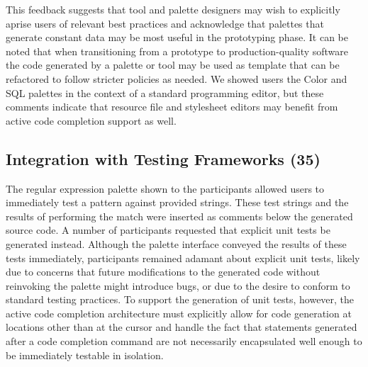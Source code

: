 \documentclass[10pt, conference, compsocconf]{IEEEtran}
\begin{document}
This feedback suggests that tool and palette designers may wish to explicitly aprise users of relevant best practices and acknowledge that palettes that generate constant data may be most useful in the prototyping phase. It can be noted that when transitioning from a prototype to production-quality software the code generated by a palette or tool may be used as template that can be refactored to follow stricter policies as needed. We showed users the Color and SQL palettes in the context of a standard programming editor, but these comments indicate that resource file and  stylesheet editors may benefit from active code completion support as well.

\subsection{Integration with Testing Frameworks (35)}
The regular expression palette shown to the participants allowed users to immediately test a pattern against provided strings. These test strings and the results of performing the match were inserted as comments below the generated source code. A number of participants requested that explicit unit tests be generated instead. Although the palette interface conveyed the results of these tests immediately, participants remained adamant about explicit unit tests, likely due to concerns that future modifications to the generated code without reinvoking the palette might introduce bugs, or due to the desire to conform to standard testing practices. To support the generation of unit tests, however, the active code completion architecture must explicitly allow for code generation at locations other than at the cursor and handle the fact that statements generated after a code completion command are not necessarily encapsulated well enough to be immediately testable in isolation.

%
 
\end{document}
